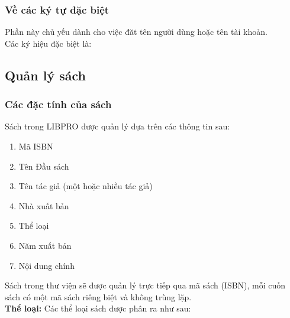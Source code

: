 \documentclass[12pt,a4paper]{report}
\begin{document}
			\subsubsection{Về các ký tự đặc biệt}
			Phần này chủ yếu dành cho việc đăt tên người dùng hoặc tên tài khoản.\\
			Các ký hiệu đặc biệt là: %
		\subsection{Quản lý sách}
			\subsubsection{Các đặc tính của sách}
			Sách trong LIBPRO được quản lý dựa trên các thông tin sau:
			\begin{enumerate}
				\item Mã ISBN
				\item Tên Đầu sách
				\item Tên tác giả (một hoặc nhiều tác giả)
				\item Nhà xuất bản
				\item Thể loại
				\item Năm xuất bản
				\item Nội dung chính
			\end{enumerate}
			Sách trong thư viện sẽ được quản lý trực tiếp qua mã sách (ISBN), mỗi cuốn sách có một mã sách riêng biệt và không trùng lặp.\\
			\textbf{Thể loại:} Các thể loại sách được phân ra như sau:
\end{document}
